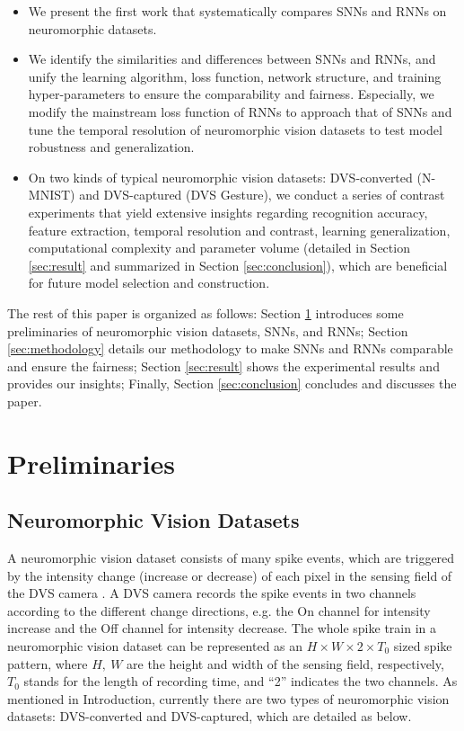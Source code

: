 \documentclass[journal,10pt,twocolumn]{IEEETran}
\begin{document}
\begin{itemize}
\item We present the first work that systematically compares SNNs and RNNs on neuromorphic datasets.

\item We identify the similarities and differences between SNNs and RNNs, and unify the learning algorithm, loss function, network structure, and training hyper-parameters to ensure the comparability and fairness. Especially, we modify the mainstream loss function of RNNs to approach that of SNNs and tune the temporal resolution of neuromorphic vision datasets to test model robustness and generalization.

\item On two kinds of typical neuromorphic vision datasets: DVS-converted (N-MNIST) and DVS-captured (DVS Gesture), we conduct a series of contrast experiments that yield extensive insights regarding recognition accuracy, feature extraction, temporal resolution and contrast, learning generalization, computational complexity and parameter volume (detailed in Section \ref{sec:result} and summarized in Section \ref{sec:conclusion}), which are beneficial for future model selection and construction.
\end{itemize}

The rest of this paper is organized as follows: Section \ref{sec:preliminary} introduces some preliminaries of neuromorphic vision datasets, SNNs, and RNNs; Section \ref{sec:methodology} details our methodology to make SNNs and RNNs comparable and ensure the fairness; Section \ref{sec:result} shows the experimental results and provides our insights; Finally, Section \ref{sec:conclusion} concludes and discusses the paper. \section{Preliminaries}\label{sec:preliminary}

\subsection{Neuromorphic Vision Datasets}\label{sec:preliminary:dataset}

A neuromorphic vision dataset consists of many spike events, which are triggered by the intensity change (increase or decrease) of each pixel in the sensing field of the DVS camera \cite{delbruck2008frame,lichtsteiner2008128,hu2016dvs}. A DVS camera records the spike events in two channels according to the different change directions, e.g. the On channel for intensity increase and the Off channel for intensity decrease. The whole spike train in a neuromorphic vision dataset can be represented as an $H \times W \times 2 \times T_0$ sized spike pattern, where $H,~W$ are the height and width of the sensing field, respectively, $T_0$ stands for the length of recording time, and ``2'' indicates the two channels. As mentioned in Introduction, currently there are two types of neuromorphic vision datasets: DVS-converted and DVS-captured, which are detailed as below.
\end{document}
